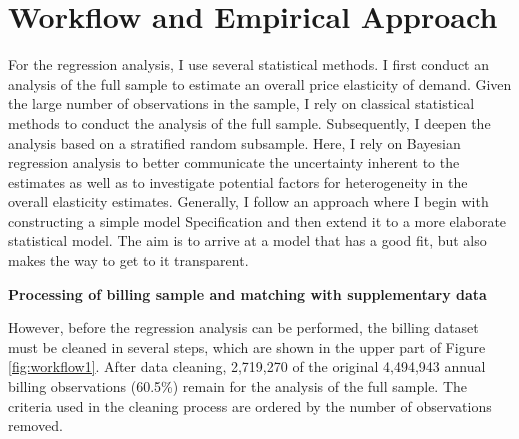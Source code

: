 \documentclass[12pt,twoside]{reedthesis}
\begin{document}
\hypertarget{workflow-empirical-approach}{%
\section{Workflow and Empirical Approach}\label{workflow-empirical-approach}}

For the regression analysis, I use several statistical methods. I first conduct an analysis of the full sample to estimate an overall price elasticity of demand. Given the large number of observations in the sample, I rely on classical statistical methods to conduct the analysis of the full sample. Subsequently, I deepen the analysis based on a stratified random subsample. Here, I rely on Bayesian regression analysis to better communicate the uncertainty inherent to the estimates as well as to investigate potential factors for heterogeneity in the overall elasticity estimates. Generally, I follow an approach where I begin with constructing a simple model Specification and then extend it to a more elaborate statistical model. The aim is to arrive at a model that has a good fit, but also makes the way to get to it transparent.

\textbf{Processing of billing sample and matching with supplementary data}

However, before the regression analysis can be performed, the billing dataset must be cleaned in several steps, which are shown in the upper part of Figure \ref{fig:workflow1}. After data cleaning, 2,719,270 of the original 4,494,943 annual billing observations (60.5\%) remain for the analysis of the full sample. The criteria used in the cleaning process are ordered by the number of observations removed.
\end{document}
